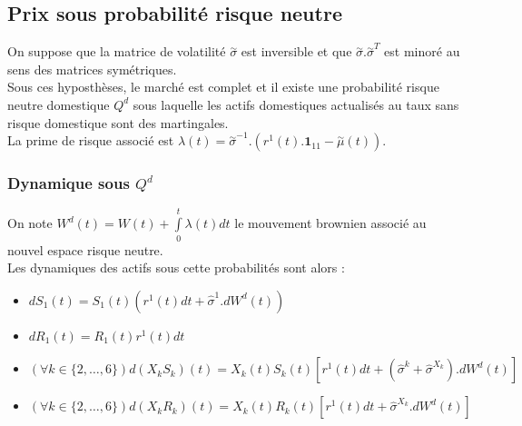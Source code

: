 \documentclass[a4paper,12pt]{article}
\begin{document}
\subsection{Prix sous probabilité risque neutre}
On suppose que la matrice de volatilité $\overset{\sim}{\sigma}$ est inversible et que $\overset{\sim}{\sigma}.\overset{\sim}{\sigma}^T$ est minoré au sens des matrices symétriques. \\
Sous ces hyposthèses, le marché est complet et il existe une probabilité risque neutre domestique $Q^d$ sous laquelle les actifs domestiques actualisés au taux sans risque domestique sont des martingales. \\
La prime de risque associé est $\lambda (t)=\overset{\sim}{\sigma}^{-1}.\left(r^1(t).\mathbf{1}_{11}-\overset{\sim}{\mu} (t)\right)$. 
\newpage
\subsubsection{Dynamique sous $Q^d$}
On note $W^d(t) = W(t)+\int\limits_0^t\lambda(t)dt$ le mouvement brownien associé au nouvel espace risque neutre.\\
Les dynamiques des actifs sous cette probabilités sont alors : 
\begin{itemize}[label=$\star$]
\item  $dS_1(t)=S_1(t)\left(r^1(t)dt+\widehat{\sigma}^1.dW^d(t)\right)$ \\
\item $dR_1(t) = R_1(t)r^1(t)dt$ \\
\item $\left(\forall k \in \{2,\ldots,6\}\right)d(X_kS_k)(t)=X_k(t)S_k(t)\left[r^1(t)dt+\left(\widehat{\sigma}^k+\widehat{\sigma}^{X_k}\right).dW^d(t)\right]$ \\
\item  $\left(\forall k \in \{2,\ldots,6\}\right)d(X_kR_k)(t)=X_k(t)R_k(t)\left[r^1(t)dt+\widehat{\sigma}^{X_k}.dW^d(t)\right]$
\end{itemize} \vspace*{2mm} 
\end{document}
